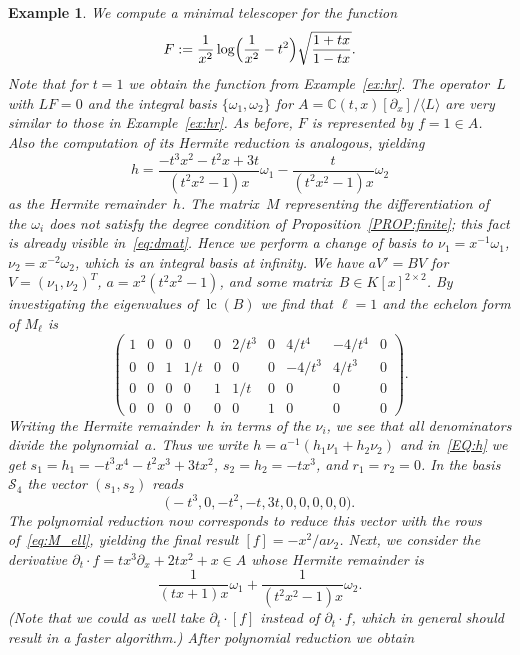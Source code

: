 \documentclass{sig-alternate}
\newtheorem{example}[theorem]{Example}
\def\<#1>{\langle#1\rangle}
\newcommand{\bC}{ {\mathbb C}}
\newcommand{\cS}{ {\mathcal S}}
\def\lc{\operatorname{lc}}
\begin{document}
\begin{example}
We compute a minimal telescoper for the function
\[
  F := \frac{1}{x^2} \log\Bigl(\frac{1}{x^2}-t^2\Bigr)\sqrt{\frac{1+tx}{1-tx}}.
\]
Note that for $t=1$ we
obtain the function from Example~\ref{ex:hr}. The operator~$L$ with $LF=0$
and the integral basis $\{\omega_1,\omega_2\}$ for
$A=\bC(t,x)[\partial_x]/\<L>$ are very similar to those in Example~\ref{ex:hr}.
As before, $F$ is represented by $f=1\in A$.
Also the computation of its Hermite reduction is analogous, yielding
\[
  h = \frac{-t^3x^2-t^2x+3t}{(t^2x^2-1)x} \omega_1 - \frac{t}{(t^2x^2-1)x} \omega_2
\]
as the Hermite remainder~$h$. The matrix~$M$ representing the differentiation
of the $\omega_i$ does not satisfy the degree condition of
Proposition~\ref{PROP:finite}; this fact is already visible
in~\eqref{eq:dmat}. Hence we perform a change of basis to
$\nu_1=x^{-1}\omega_1$, $\nu_2=x^{-2}\omega_2$, which is an integral basis at
infinity. We have $aV'=BV$ for $V=(\nu_1,\nu_2)^T$, $a=x^2(t^2x^2-1)$, and
some matrix~$B\in K[x]^{2\times2}$.  By investigating the eigenvalues of
$\lc(B)$ we find that $\ell=1$ and the echelon form of $M_\ell$ is
\begin{equation}\label{eq:M_ell}
  \begin{pmatrix}
  1 & 0 & 0 & 0 & 0 & 2/t^3 & 0 & 4/t^4 & -4/t^4 & 0 \\
  0 & 0 & 1 & 1/t & 0 & 0 & 0 & -4/t^3 & 4/t^3 & 0 \\
  0 & 0 & 0 & 0 & 1 & 1/t & 0 & 0 & 0 & 0 \\
  0 & 0 & 0 & 0 & 0 & 0 & 1 & 0 & 0 & 0
  \end{pmatrix}.
\end{equation}
Writing the Hermite remainder~$h$ in terms of the $\nu_i$, we see that all
denominators divide the polynomial~$a$. Thus we write
$h=a^{-1}(h_1\nu_1+h_2\nu_2)$ and in~\eqref{EQ:h} we get
$s_1=h_1=-t^3x^4-t^2x^3+3tx^2$, $s_2=h_2=-tx^3$, and $r_1=r_2=0$.
In the basis $\cS_4$ the vector $(s_1,s_2)$ reads
\[
  \bigl(-t^3, 0, -t^2, -t, 3 t, 0, 0, 0, 0, 0\bigr).
\]
The polynomial reduction now corresponds to reduce this vector with the rows
of~\eqref{eq:M_ell}, yielding the final result $[f]=-x^2/a\nu_2$.  Next, we
consider the derivative $\partial_t\cdot f=tx^3\partial_x+2tx^2+x\in A$ whose
Hermite remainder is
\[
  \frac{1}{(tx+1)x} \omega_1 + \frac{1}{(t^2x^2-1)x} \omega_2.
\]
(Note that we could as well take $\partial_t\cdot [f]$ instead of $\partial_t\cdot f$, which
in general should result in a faster algorithm.)
After polynomial reduction we obtain

\end{example}
\end{document}
